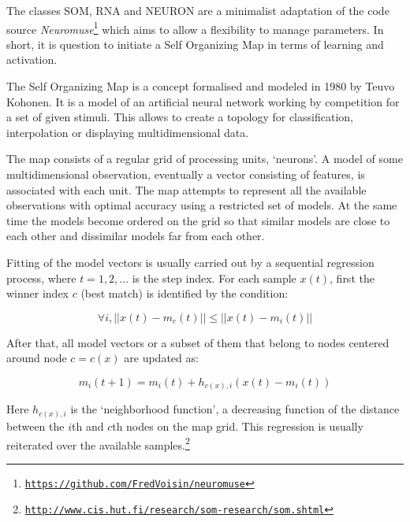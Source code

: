 The classes SOM, RNA and NEURON are a minimalist adaptation of the code source \textsl{Neuromuse}\footnote{\href{https://github.com/FredVoisin/neuromuse}{\texttt{\scriptsize https://github.com/FredVoisin/neuromuse}}} which aims to allow a flexibility to manage parameters. In short, it is question to initiate a Self Organizing Map in terms of learning and activation. 

\bigskip

The Self Organizing Map is a concept formalised and modeled in 1980 by Teuvo Kohonen. It is a model of an artificial neural network working by competition for a set of given stimuli. This allows to create a topology for classification, interpolation or displaying multidimensional data.

\bigskip

\begin{displayquote}
The map consists of a regular grid of processing units, `neurons'. A model of some multidimensional observation, eventually a vector consisting of features, is associated with each unit. The map attempts to represent all the available observations with optimal accuracy using a restricted set of models. At the same time the models become ordered on the grid so that similar models are close to each other and dissimilar models far from each other. 

\smallskip 

Fitting of the model vectors is usually carried out by a sequential regression process, where $t = 1,2,...$ is the step index. For each sample $x(t)$, first the winner index $c$ (best match) is identified by the condition:

$$\forall i, || x(t) - m_c(t) || \leq || x(t) - m_i(t) ||$$

After that, all model vectors or a subset of them that belong to nodes centered around node $c = c(x)$ are updated as:

$$m_i(t + 1) = m_i(t) + h_{c(x),i}(x(t) - m_i(t))$$

Here $h_{c(x),i}$ is the `neighborhood function', a decreasing function of the distance between the $i$th and $c$th nodes on the map grid. This regression is usually reiterated over the available samples.\footnote{\href{http://www.cis.hut.fi/research/som-research/som.shtml}{\texttt{\scriptsize http://www.cis.hut.fi/research/som-research/som.shtml}}}
\end{displayquote}

%

